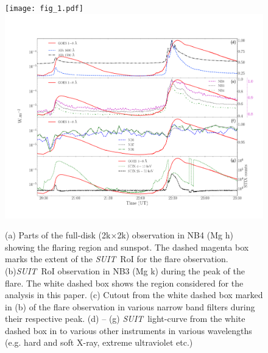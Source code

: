 \documentclass[lineno, pdflatex,sn-mathphys-ay]{sn-jnl}%
\newcommand{\suit}{{\it{SUIT}}}
\begin{document}
\begin{figure}
    \centering
    \texttt{[image: fig\_1.pdf]} \\
    \includegraphics[trim={2.3cm 2.3cm 1.8cm 4.5cm}, clip, width=0.85\linewidth]{fig1_b.pdf}
    \caption{(a) Parts of the full-disk (2k$\times$2k) observation in NB4 (Mg  h) showing the flaring region and sunspot. The dashed magenta box marks the extent of the \suit~RoI for the flare observation. (b)\suit~RoI observation in NB3 (Mg  k) during the peak of the flare. The white dashed box shows the region considered for the analysis in this paper. (c) Cutout from the white dashed box marked in (b) of the flare observation in various narrow band filters during their respective peak. (d) {--} (g) \suit~light-curve from the white dashed box in  to various other instruments in various wavelengths (e.g. hard and soft X-ray, extreme ultraviolet etc.)}
    \label{fig:flare_obs}
\end{figure}
\end{document}
